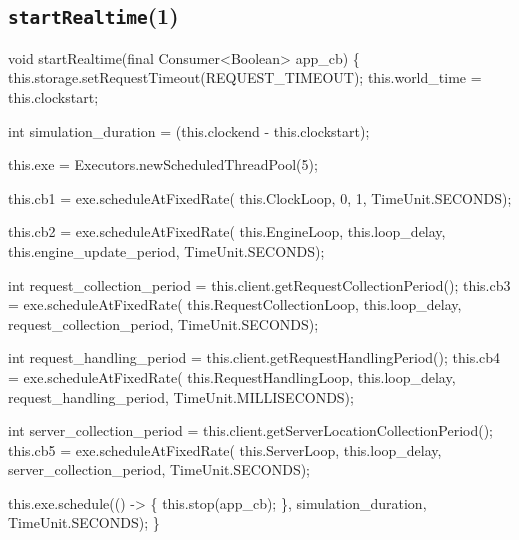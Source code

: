\subsection{\texttt{startRealtime}(1)}
\nwenddocs{}\endmoddef{}
void startRealtime(final Consumer<Boolean> app_cb) \{
  this.storage.setRequestTimeout(REQUEST_TIMEOUT);
  this.world_time = this.clockstart;

  int simulation_duration = (this.clockend - this.clockstart);

  this.exe = Executors.newScheduledThreadPool(5);

  this.cb1 = exe.scheduleAtFixedRate(
    this.ClockLoop, 0, 1, TimeUnit.SECONDS);

  this.cb2 = exe.scheduleAtFixedRate(
    this.EngineLoop, this.loop_delay, this.engine_update_period, TimeUnit.SECONDS);

  int request_collection_period = this.client.getRequestCollectionPeriod();
  this.cb3 = exe.scheduleAtFixedRate(
    this.RequestCollectionLoop, this.loop_delay, request_collection_period, TimeUnit.SECONDS);

  int request_handling_period = this.client.getRequestHandlingPeriod();
  this.cb4 = exe.scheduleAtFixedRate(
    this.RequestHandlingLoop, this.loop_delay, request_handling_period, TimeUnit.MILLISECONDS);

  int server_collection_period = this.client.getServerLocationCollectionPeriod();
  this.cb5 = exe.scheduleAtFixedRate(
    this.ServerLoop, this.loop_delay, server_collection_period, TimeUnit.SECONDS);

  this.exe.schedule(() -> \{
    this.stop(app_cb);
  \}, simulation_duration, TimeUnit.SECONDS);
\}
\eatline
{}\nwendcode{}\nwdocspar
